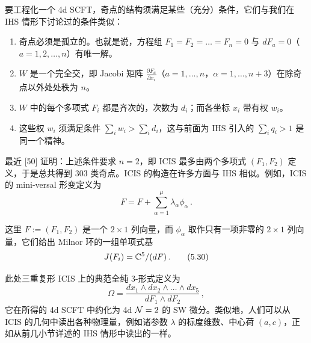 要工程化一个 4d SCFT，奇点的结构须满足某些（充分）条件，它们与我们在 IHS 情形下讨论过的条件类似：
\begin{enumerate}
  \item 奇点必须是孤立的。也就是说，方程组 $F_1=F_2=\ldots=F_n=0$ 与 $dF_a=0$（$a=1,2,\ldots,n$）有唯一解。
  \item $W$ 是一个完全交，即 Jacobi 矩阵 $\frac{\partial F_a}{\partial x_i}$（$a=1,\ldots,n$，$\alpha=1,\ldots,n+3$）在除奇点以外处处秩为 $n$。
  \item $W$ 中的每个多项式 $F_i$ 都是齐次的，次数为 $d_i$；而各坐标 $x_i$ 带有权 $w_i$。
  \item 这些权 $w_i$ 须满足条件 $\sum_i w_i > \sum_i d_i$，这与前面为 IHS 引入的 $\sum_i q_i>1$ 是同一个精神。
\end{enumerate}

最近 [50] 证明：上述条件要求 $n=2$，即 ICIS 最多由两个多项式 $(F_1,F_2)$ 定义，于是总共得到 303 类奇点。ICIS 的构造在许多方面与 IHS 相似。例如，ICIS 的 mini-versal 形变定义为
\begin{equation}
F = F + \sum_{\alpha=1}^{\mu} \lambda_\alpha \phi_\alpha\,.
\tag{5.29}
\end{equation}

这里 $F := (F_1,F_2)$ 是一个 $2\times 1$ 列向量，而 $\phi_\alpha$ 取作只有一项非零的 $2\times 1$ 列向量，它们给出 Milnor 环的一组单项式基
\begin{equation}
J(F_i) = \mathbb{C}^5/(dF)\,.
\tag{5.30}
\end{equation}

此处三重复形 ICIS 上的典范全纯 3-形式定义为
\begin{equation}
\Omega = \frac{dx_1 \wedge dx_2 \wedge \ldots \wedge dx_5}{dF_1 \wedge dF_2}\,,
\tag{5.31}
\end{equation}
它在所得的 4d SCFT 中约化为 4d $\mathcal{N}=2$ 的 SW 微分。类似地，人们可以从 ICIS 的几何中读出各种物理量，例如诸参数 $\lambda$ 的标度维数、中心荷 $(a,c)$，正如从前几小节详述的 IHS 情形中读出的一样。

